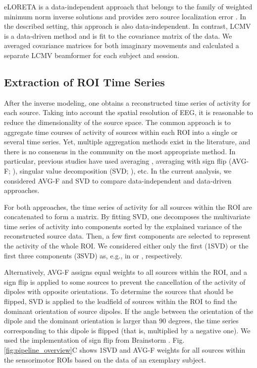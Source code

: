 \medskip

eLORETA is a data-independent approach that belongs to the family of weighted minimum norm inverse solutions and provides zero source localization error \citep{PascualMarqui2011}. In the described setting, this approach is also data-independent. In contrast, LCMV is a data-driven method and is fit to the covariance matrix of the data. We averaged covariance matrices for both imaginary movements and calculated a separate LCMV beamformer for each subject and session.

\subsection{Extraction of ROI Time Series}

After the inverse modeling, one obtains a reconstructed time series of activity for each source. Taking into account the spatial resolution of EEG, it is reasonable to reduce the dimensionality of the source space. The common approach is to aggregate time courses of activity of sources within each ROI into a single or several time series. Yet, multiple aggregation methods exist in the literature, and there is no consensus in the community on the most appropriate method. In particular, previous studies have used averaging \citep{Babiloni2005}, averaging with sign flip (AVG-F; \cite{Lai2018}), singular value decomposition (SVD; \cite{Rubega2019}), etc. In the current analysis, we considered AVG-F and SVD to compare data-independent and data-driven approaches.

\medskip

For both approaches, the time series of activity for all sources within the ROI are concatenated to form a matrix. By fitting SVD, one decomposes the multivariate time series of activity into components sorted by the explained variance of the reconstructed source data. Then, a few first components are selected to represent the activity of the whole ROI. We considered either only the first (1SVD) or the first three components (3SVD) as, e.g., in \citep{Rubega2019, Pellegrini2023} or \citep{Vidaurre2020, Pellegrini2023}, respectively. 

\medskip

Alternatively, AVG-F assigns equal weights to all sources within the ROI, and a sign flip is applied to some sources to prevent the cancellation of the activity of dipoles with opposite orientations. To determine the sources that should be flipped, SVD is applied to the leadfield of sources within the ROI to find the dominant orientation of source dipoles. If the angle between the orientation of the dipole and the dominant orientation is larger than 90 degrees, the time series corresponding to this dipole is flipped (that is, multiplied by a negative one). We used the implementation of sign flip from Brainstorm \citep{Brainstorm_Tadel2011}. Fig. \ref{fig:pipeline_overview}C shows 1SVD and AVG-F weights for all sources within the sensorimotor ROIs based on the data of an exemplary subject.

